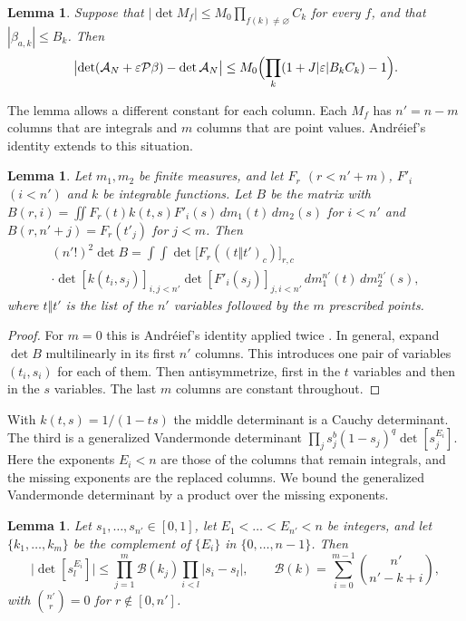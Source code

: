 \documentclass[11pt]{amsart}
\newtheorem{lemma}[theorem]{Lemma}
\theoremstyle{definition}
\theoremstyle{remark}
\numberwithin{equation}{section}
\newcommand{\cA}{\mathcal A}
\begin{document}
\begin{lemma}\label{lem:expansion}
Suppose that $|\det M_f|\le M_0\prod_{f(k)\ne\varnothing}C_k$ for every $f$, and that $|\beta_{a,k}|\le B_k$.
Then
\[
 \bigl|\det(\cA_N+\varepsilon\mathcal P\beta)-\det\cA_N\bigr|\le M_0\Bigl(\prod_k(1+J|\varepsilon|B_kC_k)-1\Bigr).
\]
\end{lemma}

The lemma allows a different constant for each column. Each $M_f$ has $n'=n-m$ columns that are integrals
and $m$ columns that are point values. Andr\'eief's identity extends to this situation.

\begin{lemma}\label{lem:andreief}
Let $m_1,m_2$ be finite measures, and let $F_r$ $(r<n'+m)$, $F'_i$ $(i<n')$ and $k$ be integrable functions.
Let $B$ be the matrix with $B(r,i)=\iint F_r(t)k(t,s)F'_i(s)\,dm_1(t)\,dm_2(s)$ for $i<n'$ and
$B(r,n'+j)=F_r(t'_j)$ for $j<m$. Then
\begin{multline*}
 (n'!)^2\det B=\int\!\!\int\det\bigl[F_r((t\Vert t')_c)\bigr]_{r,c}\\
 \cdot\det[k(t_i,s_j)]_{i,j<n'}\det[F'_i(s_j)]_{j,i<n'}\,dm_1^{n'}(t)\,dm_2^{n'}(s),
\end{multline*}
where $t\Vert t'$ is the list of the $n'$ variables followed by the $m$ prescribed points.
\end{lemma}

\begin{proof}
For $m=0$ this is Andr\'eief's identity applied twice \cite{Forrester2018Andreief}. In general, expand
$\det B$ multilinearly in its first $n'$ columns. This introduces one pair of variables $(t_i,s_i)$ for each
of them. Then antisymmetrize, first in the $t$ variables and then in the $s$ variables. The last $m$ columns
are constant throughout.
\end{proof}

With $k(t,s)=1/(1-ts)$ the middle determinant is a Cauchy determinant. The third is a generalized
Vandermonde determinant $\prod_js_j^b(1-s_j)^q\det[s_j^{E_i}]$. Here the exponents $E_i<n$ are those of the
columns that remain integrals, and the missing exponents are the replaced columns. We bound the generalized
Vandermonde determinant by a product over the missing exponents.

\begin{lemma}\label{lem:binomvand}
Let $s_1,\ldots,s_{n'}\in[0,1]$, let $E_1<\dots<E_{n'}<n$ be integers, and let $\{k_1,\ldots,k_m\}$ be the
complement of $\{E_i\}$ in $\{0,\ldots,n-1\}$. Then
\[
 \bigl|\det[s_l^{E_i}]\bigr|\le\prod_{j=1}^m\mathcal B(k_j)\prod_{i<l}|s_i-s_l|,\qquad
 \mathcal B(k)=\sum_{i=0}^{m-1}\binom{n'}{n'-k+i},
\]
with $\binom{n'}r=0$ for $r\notin[0,n']$.
\end{lemma}
\end{document}

